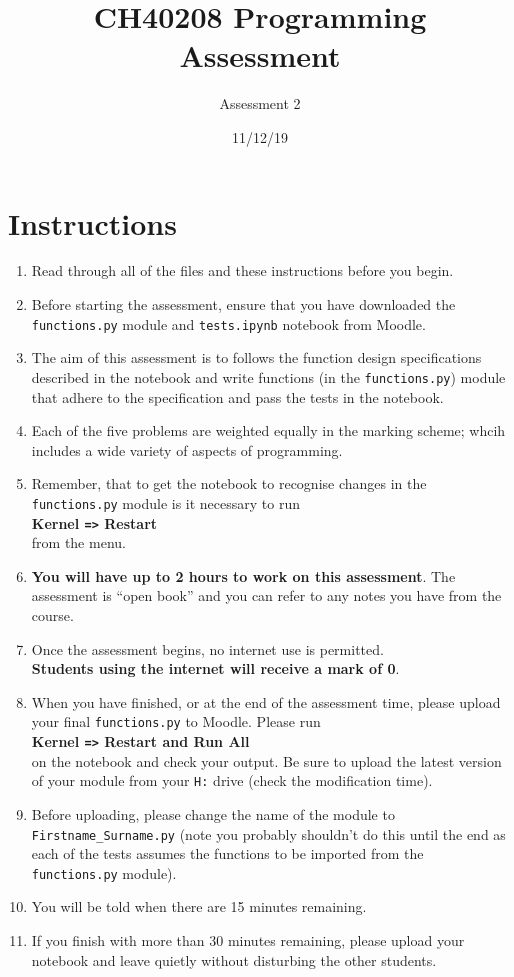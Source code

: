 \documentclass[a4paper]{article}
\title{CH40208 Programming Assessment}
\author{Assessment 2}
\date{11/12/19}
\begin{document}
\maketitle

\section*{Instructions}
\begin{enumerate}
  \item Read through all of the files and these instructions before you begin. 
  \item Before starting the assessment, ensure that you have downloaded the \texttt{functions.py} module and \texttt{tests.ipynb} notebook from Moodle. 
  \item The aim of this assessment is to follows the function design specifications described in the notebook and write functions (in the \texttt{functions.py}) module that adhere to the specification and pass the tests in the notebook. 
  \item Each of the five problems are weighted equally in the marking scheme; whcih includes a wide variety of aspects of programming.
  \item Remember, that to get the notebook to recognise changes in the \texttt{functions.py} module is it necessary to run \\\textbf{Kernel \texttt{=>} Restart}\\ from the menu. 
  \item \textbf{You will have up to 2 hours to work on this assessment}. The assessment is ``open book'' and you can refer to any notes you have from the course.
  \item Once the assessment begins, no internet use is permitted.\\\textbf{Students using the internet will receive a mark of 0}.
  \item When you have finished, or at the end of the assessment time, please upload your final \texttt{functions.py} to Moodle. Please run \\\textbf{Kernel \texttt{=>} Restart and Run All}\\ on the notebook and check your output. Be sure to upload the latest version of your module from your \texttt{H:} drive (check the modification time).
  \item Before uploading, please change the name of the module to \texttt{Firstname\_Surname.py} (note you probably shouldn't do this until the end as each of the tests assumes the functions to be imported from the \texttt{functions.py} module).
  \item You will be told when there are 15 minutes remaining.
  \item If you finish with more than 30 minutes remaining, please upload your notebook and leave quietly without disturbing the other students.
\end{enumerate}
\end{document}
